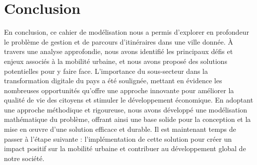 \section{Conclusion}
En conclusion, ce cahier de modélisation nous a permis d'explorer en profondeur le problème de gestion et de parcours d'itinéraires dans une ville donnée. À travers une analyse approfondie, nous avons identifié les principaux défis et enjeux associés à la mobilité urbaine, et nous avons proposé des solutions potentielles pour y faire face. L'importance du sous-secteur dans la transformation digitale du pays a été soulignée, mettant en évidence les nombreuses opportunités qu'offre une approche innovante pour améliorer la qualité de vie des citoyens et stimuler le développement économique. En adoptant une approche méthodique et rigoureuse, nous avons développé une modélisation mathématique du problème, offrant ainsi une base solide pour la conception et la mise en œuvre d'une solution efficace et durable. Il est maintenant temps de passer à l'étape suivante : l'implémentation de cette solution pour créer un impact positif sur la mobilité urbaine et contribuer au développement global de notre société.
